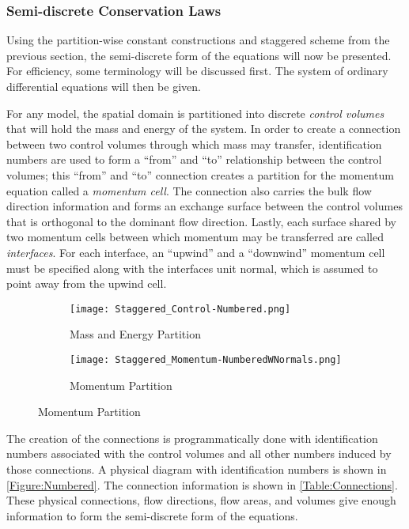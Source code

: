 \subsubsection{Semi-discrete Conservation Laws}
Using the partition-wise constant constructions and staggered scheme from the previous section, the semi-discrete form of the equations will now be presented.
For efficiency, some terminology will be discussed first.
The system of ordinary differential equations will then be given.

For any model, the spatial domain is partitioned into discrete \textit{control volumes} that will hold the mass and energy of the system.
In order to create a connection between two control volumes through which mass may transfer, identification numbers are used to form a ``from'' and ``to'' relationship between the control volumes; this ``from'' and ``to'' connection creates a partition for the momentum equation called a \textit{momentum cell}.
The connection also carries the bulk flow direction information and forms an exchange surface between the control volumes that is orthogonal to the dominant flow direction.
Lastly, each surface shared by two momentum cells between which momentum may be transferred are called \textit{interfaces}.
For each interface, an ``upwind'' and a ``downwind'' momentum cell must be specified along with the interfaces unit normal, which is assumed to point away from the upwind cell.

\begin{figure}[b]%
    \caption{A staggered, two-dimensional diagram of a tee-branch with identification numbers and interface normals.}
    \label{Figure:Numbered}
    \begin{subfigure}[t]{0.499\textwidth}%
        \centering
        \caption{Mass and Energy Partition}%
    \texttt{[image: Staggered\_Control-Numbered.png]}%
    \end{subfigure}
    \begin{subfigure}[t]{0.499\textwidth}%
        \centering
        \caption{Momentum Partition}%
    \texttt{[image: Staggered\_Momentum-NumberedWNormals.png]}%
    \end{subfigure}
\end{figure}

The creation of the connections is programmatically done with identification numbers associated with the control volumes and all other numbers induced by those connections.
A physical diagram with identification numbers is shown in \cref{Figure:Numbered}.
The connection information is shown in \cref{Table:Connections}.
These physical connections, flow directions, flow areas, and volumes give enough information to form the semi-discrete form of the equations.



